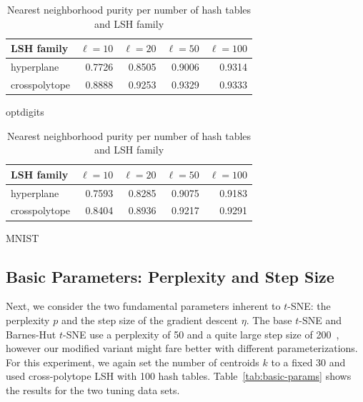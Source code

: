 \begin{table}[tb]
  \centering
  \begin{subtable}{\linewidth}
    \centering
  \begin{tabular}{lrrrr}
    \toprule
    LSH family & $\ell = 10$ & $\ell = 20$ & $\ell = 50$ & $\ell = 100$ \\ \midrule
hyperplane & \num{0.7726} & \num{0.8505} & \num{0.9006} & \num{0.9314} \\
crosspolytope & \num{0.8888} & \num{0.9253} & \num{0.9329} & \num{0.9333} \\\bottomrule
  \end{tabular}
  \caption{optdigits}
\end{subtable}
\par\bigskip
\begin{subtable}{\linewidth}
  \centering
  \begin{tabular}{lrrrr}
    \toprule
    LSH family & $\ell = 10$ & $\ell = 20$ & $\ell = 50$ & $\ell = 100$ \\ \midrule
    hyperplane & \num{0.7593} & \num{0.8285} & \num{0.9075} & \num{0.9183} \\
crosspolytope & \num{0.8404} & \num{0.8936} & \num{0.9217} & \num{0.9291} \\\bottomrule
  \end{tabular}
  \caption{MNIST}
\end{subtable}
  \caption{Nearest neighborhood purity per number of hash tables and LSH family}
  \label{tab:table-sizes}
\end{table}

\subsection{Basic Parameters: Perplexity and Step Size}

Next, we consider the two fundamental parameters inherent to $t$-SNE: the perplexity $p$
and the step size of the gradient descent $\eta$. The base $t$-SNE and Barnes-Hut $t$-SNE
use a perplexity of 50 and a quite large step size of 200~\cite{tsne,bhtsne}, however our
modified variant might fare better with different parameterizations. For this experiment,
we again set the number of centroids $k$ to a fixed 30 and used cross-polytope LSH with 100
hash tables. Table~\ref{tab:basic-params} shows the results for the two tuning data sets.

